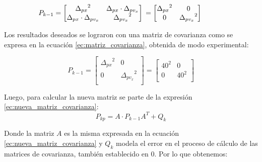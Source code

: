 \begin{enumerate}
\begin{equation}
    \hspace{-1.1cm}
    P_{k-1} = \begin{bmatrix}
    {\Delta_{px}}^2 & \Delta_{px} \cdot \Delta_{pv_x} \\
    \Delta_{px} \cdot \Delta_{pv_x} & {\Delta_{pv_x}}^2 \\
    \end{bmatrix} \\
    = \begin{bmatrix}
    {\Delta_{px}}^2 & 0 \\
    0 & {\Delta_{pv_x}}^2 \\
    \end{bmatrix} 
\end{equation}

Los resultados deseados se lograron con una matriz de covarianza como se expresa en la ecuación \ref{ec:matriz_covarianza}, obtenida de modo experimental:

\begin{equation}
    P_{k-1} =
    \begin{bmatrix}
        {\Delta_{px}}^2 & 0 \\
        0 & {\Delta_{pv_x}}^2 \\
    \end{bmatrix} 
    =
    \begin{bmatrix}
        {40}^2 & 0 \\
        0 & {40}^2 \\
    \end{bmatrix} 
    \label{ec:matriz_covarianza}
\end{equation}

Luego, para calcular la nueva matriz se parte de la expresión \ref{ec:nueva_matriz_covarianza}:
\begin{equation}
    P_{kp} = A \cdot P_{k-1} A^T + Q_k 
    \label{ec:nueva_matriz_covarianza}
\end{equation}

Donde la matriz $A$ es la misma expresada en la ecuación \ref{ec:nueva_matriz_covarianza} y $Q_k$ modela el error en el proceso de cálculo de las matrices de covarianza, también establecido en $0$. Por lo que obtenemos:


\end{enumerate}

